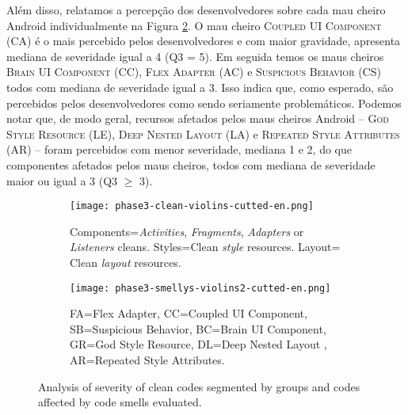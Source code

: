 Além disso, relatamos a percepção dos desenvolvedores sobre cada mau cheiro Android individualmente na Figura \ref{fig:smellys-violins}. O mau cheiro \textsc{\small Coupled UI Component} (CA) é o mais percebido pelos desenvolvedores e com maior gravidade, apresenta mediana de severidade igual a 4 (Q3 = 5). Em seguida temos os maus cheiros \textsc{\small Brain UI Component} (CC), \textsc{\small Flex Adapter} (AC) e \textsc{\small Suspicious Behavior} (CS) todos com mediana de severidade igual a 3. Isso indica que, como esperado, são percebidos pelos desenvolvedores como sendo seriamente problemáticos. Podemos notar que, de modo geral, recursos afetados pelos maus cheiros Android -- \textsc{\small God Style Resource} (LE), \textsc{\small Deep Nested Layout} (LA) e \textsc{\small Repeated Style Attributes} (AR) -- foram percebidos com menor severidade, mediana 1 e 2, do que componentes afetados pelos maus cheiros, todos com mediana de severidade maior ou igual a 3 (Q3 $\geq$ 3).  \\


\begin{figure*}[!htb]
\centering
{}\textwidth
\captionsetup[subfigure]{width=.9\imagewidth,justification=raggedright}%
\begin{subfigure}[t]{.48\textwidth}\centering
  \hspace*{-1cm}%
  \texttt{[image: phase3-clean-violins-cutted-en.png]}
  \caption{Components=\textit{Activities}, \textit{Fragments}, \textit{Adapters} or \textit{Listeners} cleans. Styles=Clean \textit{style} resources. Layout= Clean \textit{layout} resources.}
  \label{fig:clean-violins}
\end{subfigure}
\begin{subfigure}[t]{.48\textwidth}\centering
  \texttt{[image: phase3-smellys-violins2-cutted-en.png]}
  \caption{FA=Flex Adapter, CC=Coupled UI Component, SB=Suspicious Behavior, BC=Brain UI Component, GR=God Style Resource, DL=Deep Nested Layout
, AR=Repeated Style Attributes.}
  \label{fig:smellys-violins}
\end{subfigure}%
\caption{Analysis of severity of clean codes segmented by groups and codes affected by code smells evaluated.}
\label{fig:}
\end{figure*}

